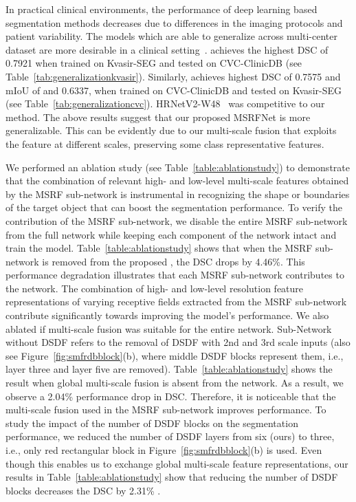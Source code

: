 \documentclass[journal,twoside,web]{IEEEtran}
\newcommand{\sysname}{\text{MSRF-Net}\xspace}
\begin{document}
In practical clinical environments, the performance of deep learning based segmentation methods decreases due to differences in the imaging protocols and patient variability. The  models  which  are  able  to  generalize  across multi-center dataset are more desirable in a clinical setting~\cite{ali2021polypgen}. \sysname achieves the highest \ac{DSC} of 0.7921 when trained on Kvasir-SEG and tested on CVC-ClinicDB (see Table~\ref{tab:generalizationkvasir}). Similarly, \sysname achieves highest \ac{DSC} of 0.7575  and \ac{mIoU} of  and 0.6337, when trained on CVC-ClinicDB and tested on Kvasir-SEG (see Table~\ref{tab:generalizationcvc}). HRNetV2-W48~\cite{wang2020deep} was competitive to our method. The above results suggest that our proposed MSRFNet is more generalizable. This can be evidently due to our multi-scale fusion that exploits the feature at different scales, preserving some class representative features.

We performed an ablation study (see Table~\ref{table:ablationstudy}) to demonstrate that the combination of relevant high- and low-level multi-scale features obtained by the MSRF sub-network is instrumental in recognizing the shape or boundaries of the target object that can boost the segmentation performance. To verify the contribution of the \ac{MSRF} sub-network, we disable the entire  \ac{MSRF} sub-network from the full network while keeping each component of the network intact and train the model. Table~\ref{table:ablationstudy} shows that when the \ac{MSRF} sub-network is removed from the proposed \sysname, the \ac{DSC} drops by 4.46\%. This performance degradation illustrates that each \ac{MSRF} sub-network contributes to the network. The combination of high- and low-level resolution feature representations of varying receptive fields extracted from the \ac{MSRF} sub-network contribute significantly towards improving the model's performance. We also ablated if multi-scale fusion was suitable for the entire network. Sub-Network without \ac{DSDF} refers to the removal of \ac{DSDF} with 2nd and 3rd scale inputs (also see Figure~\ref{fig:smfrdbblock}(b), where middle \ac{DSDF} blocks represent them, i.e., layer three and layer five are removed). Table~\ref{table:ablationstudy} shows the result when global multi-scale fusion is absent from the network. As a result, we observe a 2.04\% performance drop in \ac{DSC}. Therefore, it is noticeable that the multi-scale fusion used in the \ac{MSRF} sub-network improves performance.
To study the impact of the number of \ac{DSDF} blocks on the segmentation performance, we reduced the number of \ac{DSDF} layers from six (ours) to three, i.e., only red rectangular block in Figure~\ref{fig:smfrdbblock}(b) is used. Even though this enables us to exchange global multi-scale feature representations, our results in Table~\ref{table:ablationstudy} show that reducing the number of \ac{DSDF} blocks decreases the \ac{DSC} by 2.31\% .
\end{document}
